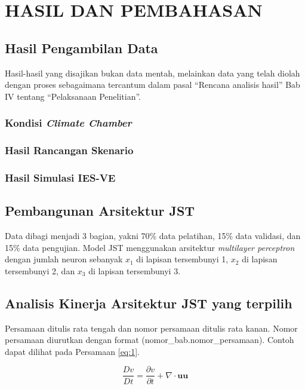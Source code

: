 \chapter{HASIL DAN PEMBAHASAN}
\label{hasil-dan-pembahasan}

\section{Hasil Pengambilan Data}
Hasil-hasil yang disajikan bukan data mentah, melainkan data yang telah diolah dengan proses sebagaimana tercantum dalam pasal ``Rencana analisis hasil'' Bab IV tentang ``Pelaksanaan Penelitian''.
\subsection{Kondisi \textit{Climate Chamber}}
\subsection{Hasil Rancangan Skenario}
\subsection{Hasil Simulasi IES-VE}

\section{Pembangunan Arsitektur JST}
Data dibagi menjadi 3 bagian, yakni 70\% data pelatihan, 15\% data validasi, dan 15\% data pengujian. Model JST menggunakan arsitektur \textit{multilayer perceptron} dengan jumlah neuron sebanyak $x_1$ di lapisan tersembunyi 1, $x_2$ di lapisan tersembunyi 2, dan $x_3$ di lapisan tersembunyi 3.

\section{Analisis Kinerja Arsitektur JST yang terpilih}

Persamaan ditulis rata tengah dan nomor persamaan ditulis rata kanan. Nomor persamaan
diurutkan dengan format (nomor\_bab.nomor\_persamaan). Contoh dapat dilihat pada Persamaan \eqref{eq:1}.

\begin{equation}
    \dfrac{Dv}{Dt} = \dfrac{\partial v}{\partial t} + \nabla \cdot \mathbf{uu}
\label{eq:1}
\end{equation}

